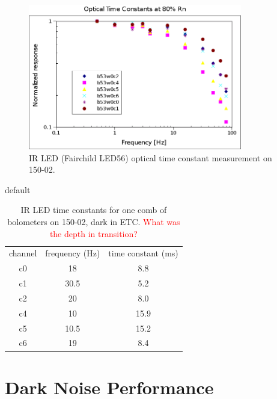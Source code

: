 \begin{figure}[ht!]
\begin{center}
\includegraphics[height=2.5in]{figures/b53w0_ir_led_tau.png}
\caption{IR LED (Fairchild LED56) optical time constant measurement on 150-02. 
\label{fig:ir_led_tau} }
\end{center}
\end{figure}

\begin{table}[htp]
\caption{default}
\begin{center}
\begin{tabular}{|c|c|c|}
channel & frequency (Hz) & time constant (ms) \\
c0 & 18 & 8.8 \\
c1 & 30.5 & 5.2 \\
c2 & 20 & 8.0 \\
c4 & 10 & 15.9 \\
c5 & 10.5 & 15.2 \\
c6 & 19 & 8.4 \\
\end{tabular}
\end{center}
\caption{IR LED time constants for one comb of bolometers on 150-02, dark in \ac{ETC}. \textcolor{red}{What was the depth in transition?}
\label{tab:optical_tau} }
\end{table}










\section{Dark Noise Performance}
\label{sec:dark_noise}

